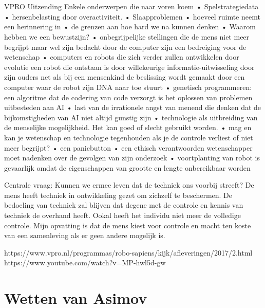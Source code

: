 \documentclass[11pt]{report}
\begin{document}
\section{}
VPRO Uitzending
Enkele onderwerpen die naar voren koem
• Spelstrategiedata
• hersenbelasting door overactiviteit.
• Slaapproblemen
• hoeveel ruimte neemt een herinnering in
• de grenzen aan hoe hard we na kunnen denken
• Waarom hebben we een bewustzijn?
• onbegrijpelijke stellingen die de mens niet meer begrijpt maar wel zijn bedacht door de computer zijn een bedreiging voor de wetenschap
• computers en robots die zich verder zullen ontwikkelen door evolutie een robot die ontstaan is door willekeurige informatie-uitwisseling door zijn ouders net als bij een mensenkind de beslissing wordt gemaakt door een computer waar de robot zijn DNA naar toe stuurt
• genetisch programmeren: een algoritme dat de codering van code verzorgt is het oplossen van problemen uitbesteden aan AI
• last van de irrationele angst van menend die denken dat de bijkomstigheden van AI niet altijd gunstig zijn
• technologie als uitbreiding van de menselijke mogelijkheid. Het kan goed of slecht gebruikt worden.
• mag en kan je wetenschap en technologie tegenhouden als je de controle verliest of niet meer begrijpt?
• een panicbutton
• een ethisch verantwoorden wetenschapper moet nadenken over de gevolgen van zijn onderzoek
• voortplanting van robot is gevaarlijk omdat de eigenschappen van grootte en lengte onbereikbaar worden

 
Centrale vraag: Kunnen we ermee leven dat de techniek ons voorbij streeft?
De mens heeft techniek in ontwikkeling gezet om zichzelf te beschermen. De bedoeling van techniek zal blijven dat degene met de controle en kennis van techniek de overhand heeft. Ookal heeft het individu niet meer de volledige controle. Mijn opvatting is dat de mens kiest voor controle en macht ten koste van een samenleving als er geen andere mogelijk is.

https://www.vpro.nl/programmas/robo-sapiens/kijk/afleveringen/2017/2.html
https://www.youtube.com/watch?v=MP-hwl5d-gw

\section{Wetten van Asimov}
\end{document}
